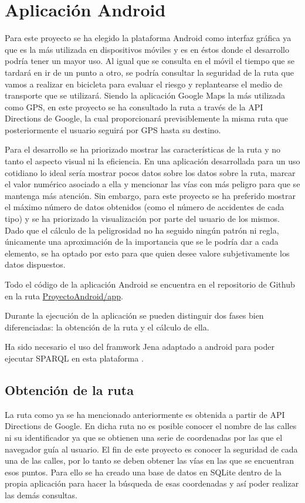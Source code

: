 \chapter{Aplicación Android}

Para este proyecto se ha elegido la plataforma Android como interfaz gráfica ya que es la más utilizada en dispositivos móviles y es en éstos donde el desarrollo podría tener un mayor uso.
Al igual que se consulta en el móvil el tiempo que se tardará en ir de un punto a otro, se podría consultar la seguridad de la ruta que vamos a realizar en bicicleta para evaluar el riesgo y replantearse el medio de transporte que se utilizará.
Siendo la aplicación Google Maps la más utilizada como GPS, en este proyecto se ha consultado la ruta a través de la API Directions de Google\cite{apiDirections}, la cual proporcionará previsiblemente la misma ruta que posteriormente el usuario seguirá por GPS hasta su destino.

Para el desarrollo se ha priorizado mostrar las características de la ruta y no tanto el aspecto visual ni la eficiencia. En una aplicación desarrollada para un uso cotidiano lo ideal sería mostrar pocos datos sobre los datos sobre la ruta, marcar el valor numérico asociado a ella y mencionar las vías con más peligro para que se mantenga más atención. Sin embargo, para este proyecto se ha preferido mostrar el máximo número de datos obtenidos (como el número de accidentes de cada tipo) y se ha priorizado la visualización por parte del usuario de los mismos. Dado que el cálculo de la peligrosidad no ha seguido ningún patrón ni regla, únicamente una aproximación de la importancia que se le podría dar a cada elemento, se ha optado por esto para que quien desee valore subjetivamente los datos dispuestos.

Todo el código de la aplicación Android se encuentra en el repositorio de Github \cite{githubRepositorio} en la ruta \url{ProyectoAndroid/app}.

Durante la ejecución de la aplicación se pueden distinguir dos fases bien diferenciadas: la obtención de la ruta y el cálculo de ella.

Ha sido necesario el uso del framwork Jena adaptado a android para poder ejecutar SPARQL en esta plataforma \cite{jenaAndroid}.








\clearpage
\section{Obtención de la ruta}
La ruta como ya se ha mencionado anteriormente es obtenida a partir de API Directions de Google. En dicha ruta no es posible conocer el nombre de las calles ni su identificador ya que se obtienen una serie de coordenadas por las que el navegador guía al usuario.
El fin de este proyecto es conocer la seguridad de cada una de las calles, por lo tanto se deben obtener las vías en las que se encuentran esos puntos. Para ello se ha creado una base de datos en SQLite dentro de la propia aplicación para hacer la búsqueda de esas coordenadas y así poder realizar las demás consultas.


